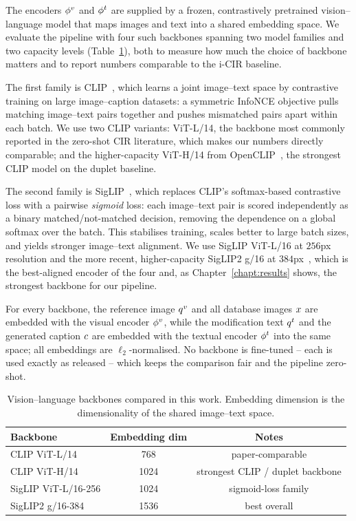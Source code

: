 The encoders $\phi^{v}$ and $\phi^{t}$ are supplied by a frozen, contrastively
pretrained vision--language model that maps images and text into a shared
embedding space. We evaluate the pipeline with four such backbones spanning two
model families and two capacity levels (Table~\ref{tab:backbones}), both to
measure how much the choice of backbone matters and to report numbers comparable
to the i-CIR baseline.

The first family is CLIP~\cite{radford2021clip}, which learns a joint
image--text space by contrastive training on large image--caption datasets: a
symmetric InfoNCE objective pulls matching image--text pairs together and pushes
mismatched pairs apart within each batch. We use two CLIP variants: ViT-L/14,
the backbone most commonly reported in the zero-shot CIR literature, which makes
our numbers directly comparable; and the higher-capacity ViT-H/14 from
OpenCLIP~\cite{ilharco2021openclip}, the strongest CLIP model on the duplet
baseline.

The second family is SigLIP~\cite{zhai2023siglip}, which replaces CLIP's
softmax-based contrastive loss with a pairwise \emph{sigmoid} loss: each
image--text pair is scored independently as a binary matched/not-matched
decision, removing the dependence on a global softmax over the batch. This
stabilises training, scales better to large batch sizes, and yields stronger
image--text alignment. We use SigLIP ViT-L/16 at $256$px resolution and the more
recent, higher-capacity SigLIP2 g/16 at $384$px~\cite{tschannen2025siglip2},
which is the best-aligned encoder of the four and, as
Chapter~\ref{chapt:results} shows, the strongest backbone for our pipeline.

For every backbone, the reference image $q^{v}$ and all database images $x$ are
embedded with the visual encoder $\phi^{v}$, while the modification text $q^{t}$ and
the generated caption $c$ are embedded with the textual encoder $\phi^{t}$ into
the same space; all embeddings are $\ell_2$-normalised. No backbone is
fine-tuned -- each is used exactly as released -- which keeps the comparison fair
and the pipeline zero-shot.

\begin{table}[h!]
\centering
\begin{tabular}{l c c}
\toprule
Backbone & Embedding dim & Notes \\ \midrule
CLIP ViT-L/14       & 768  & paper-comparable \\
CLIP ViT-H/14       & 1024 & strongest CLIP / duplet backbone \\
SigLIP ViT-L/16-256 & 1024 & sigmoid-loss family \\
SigLIP2 g/16-384    & 1536 & best overall \\
\bottomrule
\end{tabular}
\caption[Vision--language backbones compared.]{Vision--language backbones
compared in this work. Embedding dimension is the dimensionality of the shared
image--text space.\label{tab:backbones}}
\end{table}

